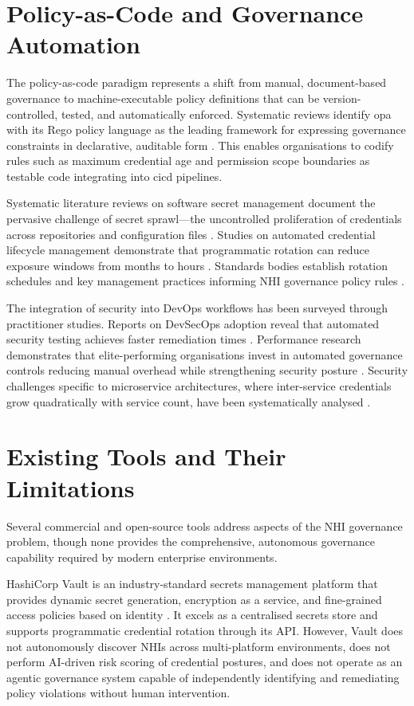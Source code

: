 \section[Policy-as-Code and Governance Automation]{\textbf{Policy-as-Code and Governance Automation}}
The policy-as-code paradigm represents a shift from manual, document-based governance to machine-executable policy definitions that can be version-controlled, tested, and automatically enforced. Systematic reviews identify \gls{opa} with its Rego policy language as the leading framework for expressing governance constraints in declarative, auditable form \cite{PolicyAsCode2023, OPADocs2024}. This enables organisations to codify rules such as maximum credential age and permission scope boundaries as testable code integrating into \gls{cicd} pipelines.

Systematic literature reviews on software secret management document the pervasive challenge of secret sprawl---the uncontrolled proliferation of credentials across repositories and configuration files \cite{SecretSprawl2024}. Studies on automated credential lifecycle management demonstrate that programmatic rotation can reduce exposure windows from months to hours \cite{CredentialRotation2024}. Standards bodies establish rotation schedules and key management practices informing NHI governance policy rules \cite{NIST80057}.

The integration of security into DevOps workflows has been surveyed through practitioner studies. Reports on DevSecOps adoption reveal that automated security testing achieves faster remediation times \cite{GitLabDevSecOps2024}. Performance research demonstrates that elite-performing organisations invest in automated governance controls reducing manual overhead while strengthening security posture \cite{DORAReport2023}. Security challenges specific to microservice architectures, where inter-service credentials grow quadratically with service count, have been systematically analysed \cite{MicroserviceSecurity2023}.

\section[Existing Tools and Limitations]{\textbf{Existing Tools and Their Limitations}}
Several commercial and open-source tools address aspects of the NHI governance problem, though none provides the comprehensive, autonomous governance capability required by modern enterprise environments.

HashiCorp Vault is an industry-standard secrets management platform that provides dynamic secret generation, encryption as a service, and fine-grained access policies based on identity \cite{HashiCorpVault}. It excels as a centralised secrets store and supports programmatic credential rotation through its API. However, Vault does not autonomously discover NHIs across multi-platform environments, does not perform AI-driven risk scoring of credential postures, and does not operate as an agentic governance system capable of independently identifying and remediating policy violations without human intervention.


